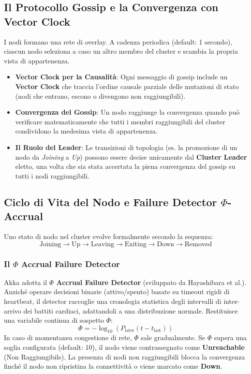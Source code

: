 \subsection{Il Protocollo Gossip e la Convergenza con Vector Clock}
I nodi formano una rete di overlay. A cadenza periodica (default: 1 secondo), ciascun nodo seleziona a caso un altro membro del cluster e scambia la propria vista di appartenenza.
\begin{itemize}
    \item \textbf{Vector Clock per la Causalità}: Ogni messaggio di gossip include un \textbf{Vector Clock} che traccia l'ordine causale parziale delle mutazioni di stato (nodi che entrano, escono o divengono non raggiungibili).
    \item \textbf{Convergenza del Gossip}: Un nodo raggiunge la convergenza quando può verificare matematicamente che tutti i membri raggiungibili del cluster condividono la medesima vista di appartenenza.
    \item \textbf{Il Ruolo del Leader}: Le transizioni di topologia (es. la promozione di un nodo da \textit{Joining} a \textit{Up}) possono essere decise unicamente dal \textbf{Cluster Leader} eletto, una volta che sia stata accertata la piena convergenza del gossip su tutti i nodi raggiungibili.
\end{itemize}

\subsection{Ciclo di Vita del Nodo e Failure Detector $\Phi$-Accrual}
Uno stato di nodo nel cluster evolve formalmente secondo la sequenza:
\begin{equation}
\text{Joining} \longrightarrow \text{Up} \longrightarrow \text{Leaving} \longrightarrow \text{Exiting} \longrightarrow \text{Down} \longrightarrow \text{Removed}
\end{equation}

\subsubsection{Il $\Phi$ Accrual Failure Detector}
Akka adotta il \textbf{$\Phi$ Accrual Failure Detector} (sviluppato da Hayashibara et al.). Anziché operare decisioni binarie (attivo/spento) basate su timeout rigidi di heartbeat, il detector raccoglie una cronologia statistica degli intervalli di inter-arrivo dei battiti cardiaci, adattandoli a una distribuzione normale. Restituisce una variabile continua di sospetto $\Phi$:
\begin{equation}
\Phi = -\log_{10}(P_{\text{later}}(t - t_{\text{last}}))
\end{equation}
In caso di momentanea congestione di rete, $\Phi$ sale gradualmente. Se $\Phi$ supera una soglia configurata (default: 10), il nodo viene contrassegnato come \textbf{Unreachable} (Non Raggiungibile). La presenza di nodi non raggiungibili blocca la convergenza finché il nodo non ripristina la connettività o viene marcato come \textbf{Down}.

